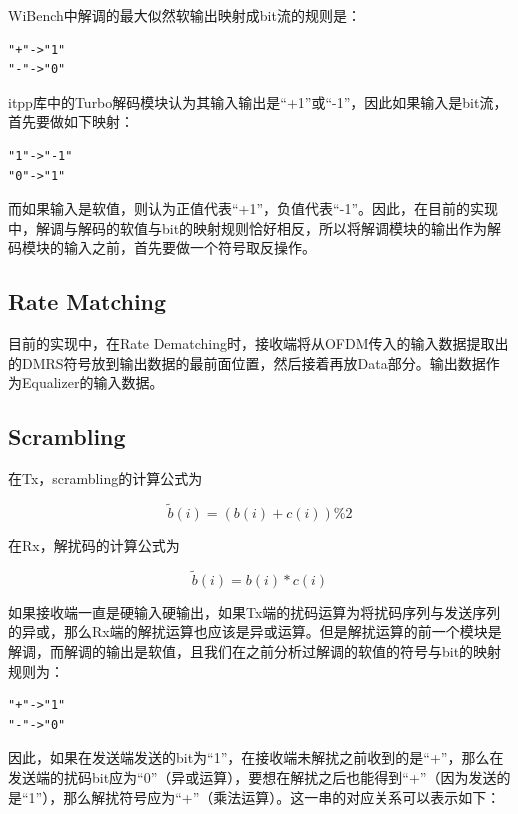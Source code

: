 \documentclass[titlepage]{article}
\numberwithin{figure}{section}
\numberwithin{equation}{section}
\begin{document}
WiBench中解调的最大似然软输出映射成bit流的规则是：

\begin{verbatim}
"+"->"1"
"-"->"0"
\end{verbatim}

itpp库中的Turbo解码模块认为其输入输出是“+1”或“-1”，因此如果输入是bit流，首先要做如下映射：

\begin{verbatim}
"1"->"-1"
"0"->"1"
\end{verbatim}

而如果输入是软值，则认为正值代表“+1”，负值代表“-1”。因此，在目前的实现中，解调与解码的软值与bit的映射规则恰好相反，所以将解调模块的输出作为解码模块的输入之前，首先要做一个符号取反操作。

\subsection{Rate Matching}

目前的实现中，在Rate Dematching时，接收端将从OFDM传入的输入数据提取出的DMRS符号放到输出数据的最前面位置，然后接着再放Data部分。输出数据作为Equalizer的输入数据。

\subsection{Scrambling}

在Tx，scrambling的计算公式为

\begin{displaymath}
  {\tilde b(i)}=(b(i)+c(i))\%2
\end{displaymath}

在Rx，解扰码的计算公式为

\begin{displaymath}
  {\tilde b(i)}=b(i)*c(i)
\end{displaymath}

如果接收端一直是硬输入硬输出，如果Tx端的扰码运算为将扰码序列与发送序列的异或，那么Rx端的解扰运算也应该是异或运算。但是解扰运算的前一个模块是解调，而解调的输出是软值，且我们在之前分析过解调的软值的符号与bit的映射规则为：

\begin{verbatim}
"+"->"1"
"-"->"0"
\end{verbatim}

因此，如果在发送端发送的bit为“1”，在接收端未解扰之前收到的是“+”，那么在发送端的扰码bit应为“0”（异或运算），要想在解扰之后也能得到“+”（因为发送的是“1”），那么解扰符号应为“+”（乘法运算）。这一串的对应关系可以表示如下：
\end{document}
